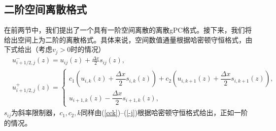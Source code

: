 \subsection{二阶空间离散格式}
在前两节中，我们提出了一个具有一阶空间离散的离散gPC格式。接下来，我们将给出空间上为二阶的离散格式。具体来说，空间数值通量根据哈密顿守恒格式，由下式给出（考虑$v_j>0$时的情况）
\begin{equation}\label{xflux}
  \begin{aligned}
    &u^-_{i+1/2,j}(z) = u_{ij}(z) + \frac{\Delta x}{2}s_{ij}(z), \\
    &u^+_{i+1/2,j}(z) = 
    \begin{cases}
      c_1\left(u_{i,k}(z) + \dfrac{\Delta x}{2}s_{i,k}(z)\right) + c_2\left(u_{i,k+1}(z) + \dfrac{\Delta x}{2}s_{i,k+1}(z)\right),  \\
      u_{i+1, k}(z) - \dfrac{\Delta x}{2}s_{i+1, k}(z),
    \end{cases}
  \end{aligned}
\end{equation}
$s_{ij}$为斜率限制器，$c_1,c_2,k$同样由(\ref{cck})--(\ref{-j})根据哈密顿守恒格式给出，正如一阶的情况。

